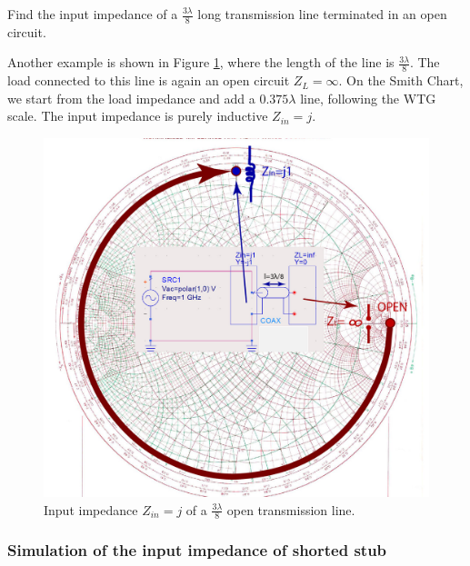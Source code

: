 \documentclass{ximera}
\begin{document}
\begin{example}

Find the input impedance of a $\frac{3 \lambda}{8}$ long transmission line terminated in an open circuit.


\begin{explanation}

Another example is shown in Figure \ref{fig:OpenStub3LambdaOver8}, where the length of the line is  $\frac{3 \lambda}{8}$. The load connected to this line is again an open circuit $Z_L=\infty$. On the Smith Chart, we start from the load impedance and add a $0.375 \lambda$ line, following the WTG scale. The input impedance is purely inductive $Z_{in}=j$.

\begin{figure}[htbp]
\begin{center}
\includegraphics[scale=1]{../jpg/openstub2-01.jpg}
\end{center}
\caption{Input impedance $Z_{in}=j$  of a $\frac{3 \lambda}{8}$ open transmission line.}
\label{fig:OpenStub3LambdaOver8}
\end{figure}


\end{explanation}
\end{example}

\subsubsection{Simulation of the input impedance of shorted stub}
\end{document}
